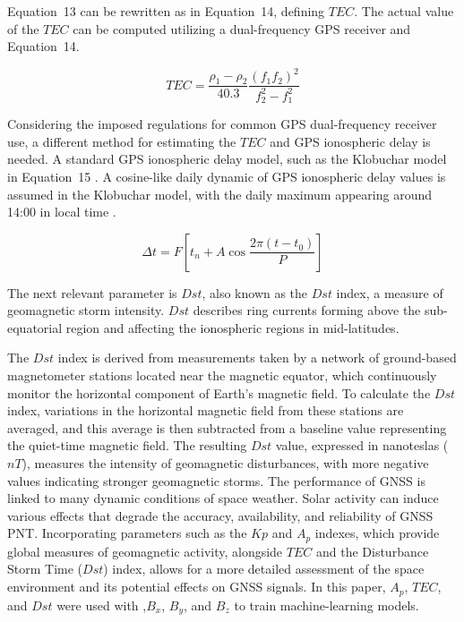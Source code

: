 \documentclass[sn-mathphys-num]{sn-jnl}%
\begin{document}
Equation~13 can be rewritten as in Equation~14, defining $TEC$. The actual value of the $TEC$ can be computed utilizing a dual-frequency GPS receiver and Equation~14.

\begin{equation}
	TEC = \frac{\rho_{1} - \rho_{2}}{40.3} \frac{{\left(f_{1}f_{2}\right)}^{2}}{f_{2}^{2}-f_{1}^{2}}
	\label{eqn:14}
\end{equation}

Considering the imposed regulations for common GPS dual-frequency receiver use, a different method for estimating the $TEC$ and GPS ionospheric delay is needed. A standard GPS ionospheric delay model, such as the Klobuchar model in Equation~15 \cite{enge1994global,spilker1996global}. A cosine-like daily dynamic of GPS ionospheric delay values is assumed in the Klobuchar model, with the daily maximum appearing around 14:00 in local time \cite{klobuchar1987ionospheric}.

\begin{equation}
	\Delta t = F \left[ t_{n} + A \cos \frac{2\pi\left(t-t_{0}\right)}{P} \right]
	\label{eqn:15}
\end{equation}

The next relevant parameter is $Dst$, also known as the $Dst$ index, a measure of geomagnetic storm intensity. $Dst$ describes ring currents forming above the sub-equatorial region and affecting the ionospheric regions in mid-latitudes.

The $Dst$ index is derived from measurements taken by a network of ground-based magnetometer stations located near the magnetic equator, which continuously monitor the horizontal component of Earth's magnetic field. To calculate the $Dst$ index, variations in the horizontal magnetic field from these stations are averaged, and this average is then subtracted from a baseline value representing the quiet-time magnetic field. The resulting $Dst$ value, expressed in nanoteslas ($nT$), measures the intensity of geomagnetic disturbances, with more negative values indicating stronger geomagnetic storms. The performance of GNSS is linked to many dynamic conditions of space weather. Solar activity can induce various effects that degrade the accuracy, availability, and reliability of GNSS PNT. Incorporating parameters such as the $Kp$ and $A_p$ indexes, which provide global measures of geomagnetic activity, alongside $TEC$ and the Disturbance Storm Time ($Dst$) index, allows for a more detailed assessment of the space environment and its potential effects on GNSS signals. In this paper, $A_p$, $TEC$, and $Dst$ were used with ,$B_x$, $B_y$, and $B_z$ to train machine-learning models.
\end{document}
